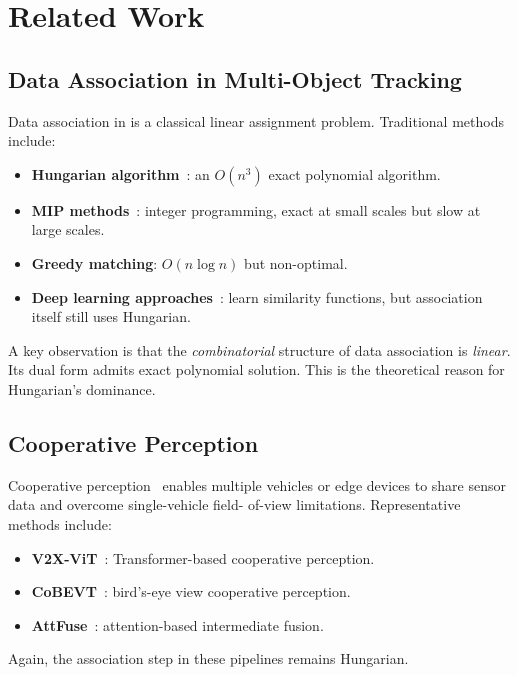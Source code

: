 \section{Related Work}
\label{sec:related}

\subsection{Data Association in Multi-Object Tracking}

Data association in \MOT is a classical linear assignment problem. 
Traditional methods include:
\begin{itemize}[leftmargin=*]
    \item \textbf{Hungarian algorithm}~\cite{kuhn1955hungarian}: 
          an $O(n^3)$ exact polynomial algorithm.
    \item \textbf{MIP methods}~\cite{jiang2015multiple}: integer 
          programming, exact at small scales but slow at large scales.
    \item \textbf{Greedy matching}: $O(n \log n)$ but non-optimal.
    \item \textbf{Deep learning approaches}~\cite{zhang2022bytetrack,
          cao2023observation}: learn similarity functions, but 
          association itself still uses Hungarian.
\end{itemize}

A key observation is that the \emph{combinatorial} structure of \MOT 
data association is \emph{linear}. Its dual form admits exact polynomial 
solution. This is the theoretical reason for Hungarian's dominance.

\subsection{Cooperative Perception}

Cooperative perception~\cite{chen2019cooper} enables multiple vehicles 
or edge devices to share sensor data and overcome single-vehicle field-
of-view limitations. Representative methods include:
\begin{itemize}[leftmargin=*]
    \item \textbf{V2X-ViT}~\cite{xu2022v2x}: Transformer-based 
          cooperative perception.
    \item \textbf{CoBEVT}~\cite{xu2022cobevt}: bird's-eye view 
          cooperative perception.
    \item \textbf{AttFuse}~\cite{xu2022opv2v}: attention-based 
          intermediate fusion.
\end{itemize}
Again, the association step in these pipelines remains Hungarian.

